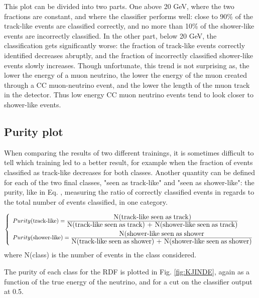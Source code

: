This plot can be divided into two parts. One above 20 GeV, where the two fractions are constant, and where the classifier performs well: close to 90\% of the track-like events are classified correctly, and no more than 10\% of the shower-like events are incorrectly classified. In the other part, below 20 GeV, the classification gets significantly worse: the fraction of track-like events correctly identified decreases abruptly, and the fraction of incorrectly classified shower-like events slowly increases. Though unfortunate, this trend is not surprising as, the lower the energy of a muon neutrino, the lower the energy of the muon created through a CC muon-neutrino event, and the lower the length of the muon track in the detector. Thus low energy CC muon neutrino events tend to look closer to shower-like events.

\subsection{Purity plot}

\qquad When comparing the results of two different trainings, it is sometimes difficult to tell which training led to a better result, for example when the fraction of events classified as track-like decreases for both classes. Another quantity can be defined for each of the two final classes, "seen as track-like" and "seen as shower-like": the purity, like in Eq. , measuring the ratio of correctly classified events in regards to the total number of events classified, in one category.

\begin{equation}
    \left\{
    	\begin{array}{ll}
    		Purity(\text{track-like})=\frac{\text{\large N(track-like\;seen\;as\;track)}}{\text{\large N(track-like\;seen\;as\;track) + N(shower-like\;seen\;as\;track)}} \\[10pt]
		    Purity(\text{shower-like})=\frac{\text{\large N(shower-like\;seen\;as\;shower}}{\text{\large N(track-like\;seen\;as\;shower) + N(shower-like\;seen\;as\;shower)}}
    	\end{array}
   	\right.
    \label{EIOZ}
\end{equation}
where N(class) is the number of events in the class considered.

The purity of each class for the RDF is plotted in Fig. \ref{fig:KJINDE}, again as a function of the true energy of the neutrino, and for a cut on the classifier output at 0.5.

